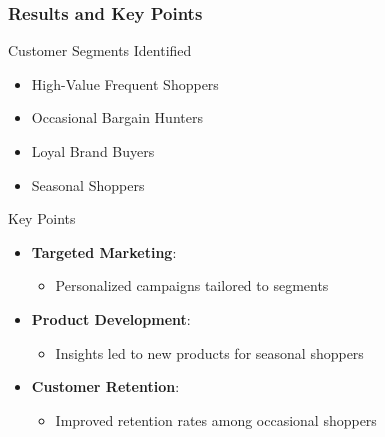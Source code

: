 \documentclass[aspectratio=169]{beamer}
\begin{document}
\begin{frame}[fragile]
    \frametitle{Results and Key Points}
    \begin{block}{Customer Segments Identified}
        \begin{itemize}
            \item High-Value Frequent Shoppers
            \item Occasional Bargain Hunters
            \item Loyal Brand Buyers
            \item Seasonal Shoppers
        \end{itemize}
    \end{block}
    
    \begin{block}{Key Points}
        \begin{itemize}
            \item \textbf{Targeted Marketing}:
                \begin{itemize}
                    \item Personalized campaigns tailored to segments
                \end{itemize}
            \item \textbf{Product Development}:
                \begin{itemize}
                    \item Insights led to new products for seasonal shoppers
                \end{itemize}
            \item \textbf{Customer Retention}:
                \begin{itemize}
                    \item Improved retention rates among occasional shoppers
                \end{itemize}
        \end{itemize}
    \end{block}
\end{frame}
\end{document}
